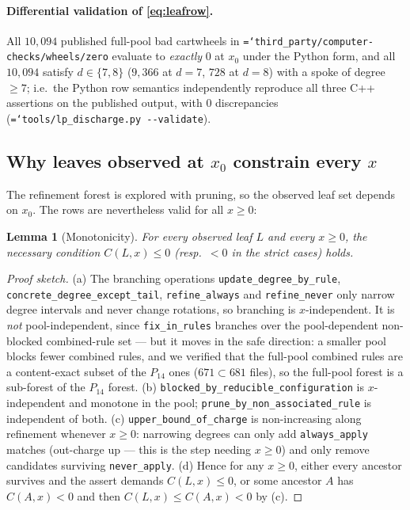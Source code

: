 \documentclass[11pt]{article}
\newtheorem{lemma}[theorem]{Lemma}
\theoremstyle{definition}
\newcommand{\art}[1]{{\texttt{\hyphenchar\font=`\-\relax #1}}}
\begin{document}
\paragraph{Differential validation of \eqref{eq:leafrow}.} All $10{,}094$ published
full-pool bad cartwheels in \art{third\_party/computer-checks/wheels/zero} evaluate
to \emph{exactly} $0$ at $x_0$ under the Python form, and all $10{,}094$ satisfy
$d\in\{7,8\}$ ($9{,}366$ at $d=7$, $728$ at $d=8$) with a spoke of degree $\ge 7$;
i.e.\ the Python row semantics independently reproduce all three C++ assertions on
the published output, with $0$ discrepancies
(\art{tools/lp\_discharge.py -{}-validate}).

\subsection{Why leaves observed at $x_0$ constrain every $x$}

The refinement forest is explored with pruning, so the observed leaf set depends on
$x_0$. The rows are nevertheless valid for all $x \ge 0$:

\begin{lemma}[Monotonicity]
\label{lem:mono}
For every observed leaf $L$ and every $x \ge 0$, the necessary condition
$C(L,x)\le 0$ (resp.\ $<0$ in the strict cases) holds.
\end{lemma}

\begin{proof}[Proof sketch]
(a) The branching operations \texttt{update\_degree\_by\_rule},
\texttt{concrete\_degree\_except\_tail}, \texttt{refine\_always} and
\texttt{refine\_never} only narrow degree intervals and never change rotations, so
branching is $x$-independent. It is \emph{not} pool-independent, since
\texttt{fix\_in\_rules} branches over the pool-dependent non-blocked combined-rule
set --- but it moves in the safe direction: a smaller pool blocks fewer combined
rules, and we verified that the full-pool combined rules are a content-exact subset
of the $P_{14}$ ones ($671 \subset 681$ files), so the full-pool forest is a
sub-forest of the $P_{14}$ forest.
(b) \texttt{blocked\_by\_reducible\_configuration} is $x$-independent and monotone in
the pool; \texttt{prune\_by\_non\_associated\_rule} is independent of both.
(c) \texttt{upper\_bound\_of\_charge} is non-increasing along refinement whenever
$x \ge 0$: narrowing degrees can only add \texttt{always\_apply} matches (out-charge
up --- this is the step needing $x\ge 0$) and only remove candidates surviving
\texttt{never\_apply}.
(d) Hence for any $x\ge 0$, either every ancestor survives and the assert demands
$C(L,x)\le 0$, or some ancestor $A$ has $C(A,x)<0$ and then $C(L,x)\le C(A,x)<0$ by (c).
\end{proof}
\end{document}
